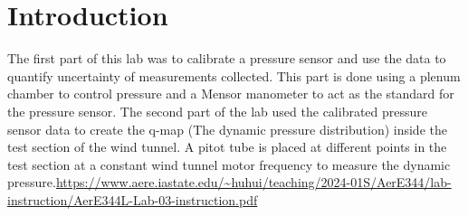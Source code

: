 \chapter{Introduction}
\label{cp:introduction}
The first part of this lab was to calibrate a pressure sensor and use the data to quantify uncertainty of measurements collected. This part is done using a plenum chamber to control pressure and a Mensor manometer to act as the standard for the pressure sensor. The second part of the lab used the calibrated pressure sensor data to create the q-map (The dynamic pressure distribution) inside the test section of the wind tunnel. A pitot tube is placed at different points in the test section at a constant wind tunnel motor frequency to measure the dynamic pressure.\url{https://www.aere.iastate.edu/~huhui/teaching/2024-01S/AerE344/lab-instruction/AerE344L-Lab-03-instruction.pdf}